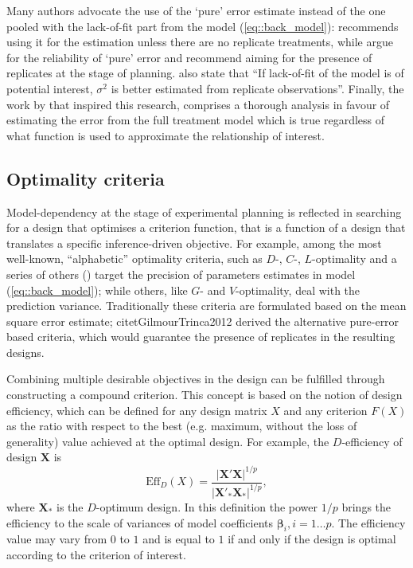 \documentclass[11pt]{article}
\begin{document}
Many authors advocate the use of the `pure' error estimate instead of the one pooled with the lack-of-fit part from the model (\ref{eq::back_model}): \cite{Cox1958planning} recommends using it for the estimation unless there are no replicate treatments, while \cite{Draper1998} argue for the reliability of `pure' error and recommend aiming for the presence of replicates at the stage of planning. \cite{Atkinson2007} also state that ``If lack-of-fit of the model is of potential interest, $\sigma^{2}$ is better estimated from replicate observations''. Finally, the work by \cite{GilmourTrinca2012} that inspired this research, comprises a thorough analysis in favour of estimating the error from the full treatment model which is true regardless of what function is used to approximate the relationship of interest.


\subsection*{Optimality criteria}

Model-dependency at the stage of experimental planning is reflected in searching for a design that optimises a criterion function, that is a function of a design that translates a specific inference-driven objective. For example, among the most well-known, ``alphabetic'' optimality criteria, such as $D$-, $C$-, $L$-optimality and a series of others (\cite{Atkinson2007}) target the precision of parameters estimates in model (\ref{eq::back_model}); while others, like $G$- and $V$-optimality, deal with the prediction variance. Traditionally these criteria are formulated based on the mean square error estimate; citet{GilmourTrinca2012} derived the alternative pure-error based criteria, which would guarantee the presence of replicates in the resulting designs. 

Combining multiple desirable objectives in the design can be fulfilled through constructing a compound criterion. This concept is based on the notion of design efficiency, which can be defined for any design matrix $X$ and any criterion $F(X)$ as the ratio with respect to the best (e.g. maximum, without the loss of generality) value achieved at the optimal design. For example, the $D$-efficiency of design $\bm{X}$ is
\begin{equation*}
\mbox{Eff}_{D}(X)=\frac{\vert \bm{X}'\bm{X}\vert^{1/p}}{\vert \bm{X}'_{*}\bm{X}_{*}\vert^{1/p}},
\end{equation*}   
where $\bm{X}_{*}$ is the $D$-optimum design. In this definition the power $1/p$ brings the efficiency to the scale of variances of model coefficients $\bm{\beta}_{i}, i=1\ldots p.$ The efficiency value may vary from $0$ to $1$ and is equal to $1$ if and only if the design is optimal according to the criterion of interest.
\end{document}
